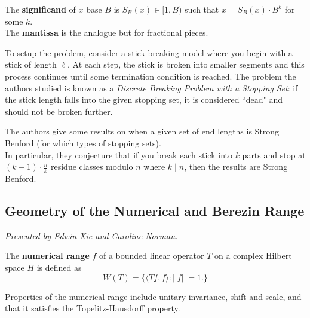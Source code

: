 \documentclass[12pt]{amsart}
\begin{document}
\begin{definition}
The \textbf{significand} of $x$ base $B$ is $S_B(x) \in [1, B)$ such that $x = S_B(x) \cdot B^k$ for some $k$. \\

The \textbf{mantissa} is the analogue but for fractional pieces.
\end{definition}

\vspace{0.5cm}

To setup the problem, consider a stick breaking model where you begin with a stick of length $\ell$. At each step, the stick is broken into smaller segments and this process continues until some termination condition is reached. The problem the authors studied is known as a \textit{Discrete Breaking Problem with a Stopping Set}: if the stick length falls into the given stopping set, it is considered ``dead" and should not be broken further. \\

\begin{result*}
The authors give some results on when a given set of end lengths is Strong Benford (for which types of stopping sets). \\

In particular, they conjecture that if you break each stick into $k$ parts and stop at $(k-1) \cdot \frac{n}{k}$ residue classes modulo $n$ where $k \mid n$, then the results are Strong Benford.
\end{result*}

\vspace{2.5cm}

\subsection{Geometry of the Numerical and Berezin Range}

\textit{}
\vspace{0.25cm}

\textit{Presented by Edwin Xie and Caroline Norman.}

\begin{definition}
The \textbf{numerical range} $f$ of a bounded linear operator $T$ on a complex Hilbert space $H$ is defined as
\[ W(T) = \{\langle Tf, f \rangle : ||f|| = 1.\} \]

Properties of the numerical range include unitary invariance, shift and scale, and that it satisfies the Topelitz-Hausdorff property.
\end{definition}
\end{document}

